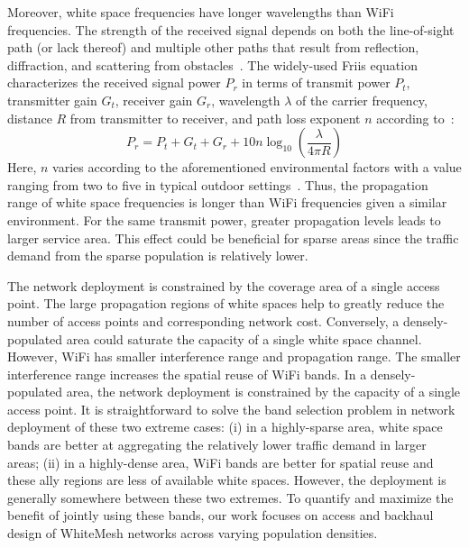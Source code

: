 Moreover, white space frequencies have longer wavelengths than WiFi frequencies. 
The strength of the received signal depends on both the line-of-sight path (or lack 
thereof) and multiple other paths that result from reflection, diffraction, and scattering 
from obstacles~\cite{andersen1995propagation}. The widely-used Friis equation characterizes 
the received signal power $P_r$ in terms of transmit power $P_t$, transmitter gain $G_t$, 
receiver gain $G_r$, wavelength $\lambda$ of the carrier frequency, distance $R$ from transmitter 
to receiver, and path loss exponent $n$ according to~\cite{friis}:
\begin{equation}
\label{eq:friis}
P_r=P_t+G_t+G_r+10n \log_{10}\left( \frac{\lambda}{4\pi R}\right)
\end{equation}
Here, $n$ varies according to the aforementioned environmental factors with a value 
ranging from two to five in typical outdoor settings~\cite{rappaport}.
Thus, the propagation range of white space frequencies is longer than WiFi frequencies
given a similar environment. For the same transmit power, greater propagation levels leads to larger service area.
This effect could be beneficial for sparse areas since the traffic demand from the sparse population is relatively lower. 

The network deployment is constrained by the coverage area of a single access point. 
The large propagation regions of white spaces help to greatly reduce the number of access points and corresponding network cost. 
Conversely, a densely-populated area could saturate the capacity of a single white space channel. 
However, WiFi has smaller interference range and propagation range. The smaller interference range increases 
the spatial reuse of WiFi bands. In a densely-populated area, the network deployment is constrained by the 
capacity of a single access point. It is straightforward to solve the band selection problem in network deployment 
of these two extreme cases: (i) in a highly-sparse area, white space bands are better at aggregating the 
relatively lower traffic demand in larger areas; (ii) in a highly-dense area, WiFi bands are better 
for spatial reuse and these ally regions are less of available white spaces.
However, the deployment is generally somewhere between these two extremes. 
To quantify and maximize the benefit of jointly using these bands, 
our work focuses on access and backhaul design of WhiteMesh networks across varying population densities. 



